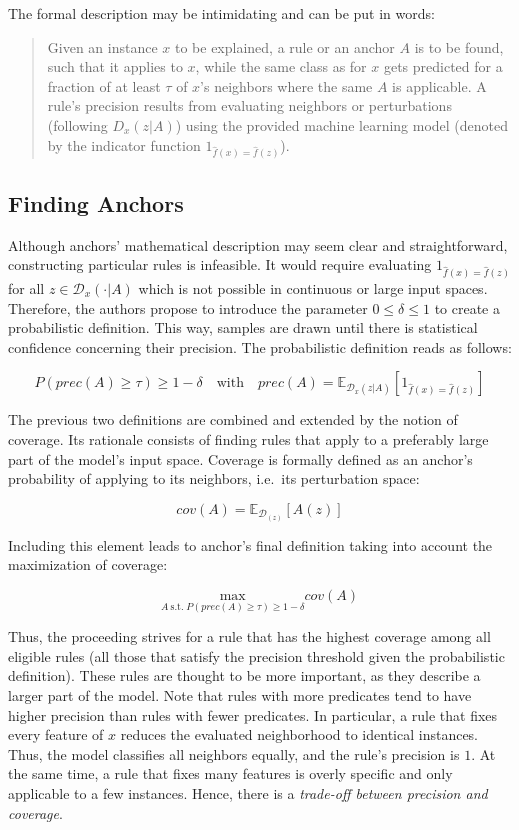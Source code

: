\documentclass[
  10pt,
]{scrbook}
\begin{document}
The formal description may be intimidating and can be put in words:

\begin{quote}
Given an instance \(x\) to be explained, a rule or an anchor \(A\) is to be found, such that it applies to \(x\), while the same class as for \(x\) gets predicted for a fraction of at least \(\tau\) of \(x\)'s neighbors where the same \(A\) is applicable. A rule's precision results from evaluating neighbors or perturbations (following \(D_x (z|A)\)) using the provided machine learning model (denoted by the indicator function \(1_{\hat{f}(x) = \hat{f}(z)}\)).
\end{quote}

\hypertarget{finding-anchors}{%
\subsection{Finding Anchors}\label{finding-anchors}}

Although anchors' mathematical description may seem clear and straightforward, constructing particular rules is infeasible. It would require evaluating \(1_{\hat{f}(x) = \hat{f}(z)}\) for all \(z \in \mathcal{D}_x(\cdot|A)\) which is not possible in continuous or large input spaces. Therefore, the authors propose to introduce the parameter \(0 \leq \delta \leq 1\) to create a probabilistic definition. This way, samples are drawn until there is statistical confidence concerning their precision. The probabilistic definition reads as follows:

\[P(prec(A)\geq\tau)\geq{}1-\delta\quad\textrm{with}\quad{}prec(A)=\mathbb{E}_{\mathcal{D}_x(z|A)}[1_{\hat{f}(x)=\hat{f}(z)}]\]

The previous two definitions are combined and extended by the notion of coverage. Its rationale consists of finding rules that apply to a preferably large part of the model's input space. Coverage is formally defined as an anchor's probability of applying to its neighbors, i.e.~its perturbation space:

\[cov(A)=\mathbb{E}_{\mathcal{D}_{(z)}}[A(z)]\]

Including this element leads to anchor's final definition taking into account the maximization of coverage:

\[\underset{A\:\textrm{s.t.}\;P(prec(A)\geq\tau)\geq{}1-\delta}{\textrm{max}}cov(A)\]

Thus, the proceeding strives for a rule that has the highest coverage among all eligible rules (all those that satisfy the precision threshold given the probabilistic definition). These rules are thought to be more important, as they describe a larger part of the model.
Note that rules with more predicates tend to have higher precision than rules with fewer predicates. In particular, a rule that fixes every feature of \(x\) reduces the evaluated neighborhood to identical instances. Thus, the model classifies all neighbors equally, and the rule's precision is \(1\). At the same time, a rule that fixes many features is overly specific and only applicable to a few instances. Hence, there is a \emph{trade-off between precision and coverage}.
\end{document}
